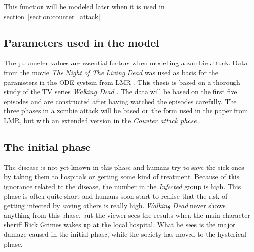 \documentclass[%
twoside,                 %
final,                   %
chapterprefix=true,      %
open=right               %
10pt]{book}
\begin{document}
\noindent
This function will be modeled later when it is used in section~\ref{section:counter_attack}


\vspace{3mm}




\vspace{3mm}



\subsection{Parameters used in the model}
The parameter values are essential factors when modelling a zombie attack. Data from the movie \emph{The Night of The Living Dead} was used as basis for the parameters in the ODE system from LMR \cite{zombie-math}. This thesis is based on a thorough study of the TV series \emph{Walking Dead} \cite{walking_dead}. The data will be based on the first five episodes and are constructed after having watched the episodes carefully. The three phases in a zombie attack will be based on the form used in the paper from LMR, but with an extended version in the \emph{Counter attack phase} .

\subsection{The initial phase}
The disease is not yet known in this phase and humans try to save the sick ones by taking them to hospitals or getting some kind of treatment. Because of this ignorance related to the disease, the number in the \emph{Infected} group is high. This phase is often quite short and humans soon start to realise that the risk of getting infected by saving others is really high. \emph{Walking Dead} never shows anything from this phase, but the viewer sees the results when the main character sheriff Rick Grimes wakes up at the local hospital. What he sees is the major damage caused in the initial phase, while the society has moved to the hysterical phase.


\vspace{3mm}




\vspace{3mm}
\end{document}

